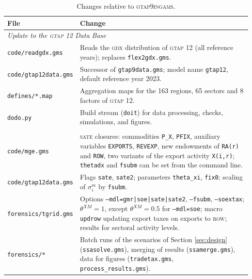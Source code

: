 \documentclass{jgea}
\newcommand{\GDX}{\textsc{gdx}\xspace}
\newcommand{\SATE}{\textsc{sate}\xspace}
\newcommand{\GTAP}{\textsc{gtap}\xspace}
\newcommand{\GTAPnine}{\textsc{gtap9ingams}\xspace}
\begin{document}
\begin{table}[t!]
\begin{center}
\caption{Changes relative to \GTAPnine \citep{LanzRutherford2016}.}\label{tab:changes}
\small
\begin{tabular}{lp{8.2cm}}
\toprule
File & Change \\
\midrule
\multicolumn{2}{l}{\textit{Update to the \GTAP 12 Data Base}} \\
\texttt{code/readgdx.gms} & Reads the \GDX distribution of \GTAP 12
(all reference years); replaces \texttt{flex2gdx.gms}. \\
\texttt{code/gtap12data.gms} & Successor of \texttt{gtap9data.gms};
model name \texttt{gtap12}, default reference year 2023. \\
\texttt{defines/*.map} & Aggregation maps for the 163 regions, 65
sectors and 8 factors of \GTAP 12. \\
\texttt{dodo.py} & Build stream (\texttt{doit}) for data processing,
checks, simulations, and figures. \\
\addlinespace
\multicolumn{2}{l}{\textit{Extensions for this paper}} \\
\texttt{code/mge.gms} & \SATE closures: commodities \texttt{P\_X},
\texttt{PFIX}, auxiliary variables \texttt{EXPORTS}, \texttt{REVEXP},
new endowments of \texttt{RA(r)} and \texttt{ROW}, two variants of the
export activity \texttt{X(i,r)}; \texttt{thetadx} and \texttt{fsubm}
can be set from the command line. \\
\texttt{code/gtap12data.gms} & Flags \texttt{sate}, \texttt{sate2};
parameters \texttt{theta\_xi}, \texttt{fix0}; scaling of
$\sigma^m_i$ by \texttt{fsubm}. \\
\texttt{forensics/tgrid.gms} & Options \texttt{--mdl=gmr|soe|sate|sate2},
\texttt{--fsubm}, \texttt{--soextax}; $\theta^{XM}=1$, except
$\theta^{XM}=0.5$ for \texttt{--mdl=soe}; macro
\texttt{updrow} updating export taxes on exports to \textsc{row};
results for sectoral activity levels. \\
\texttt{forensics/*} & Batch runs of the scenarios of Section
\ref{sec:design} (\texttt{ssasolve.gms}), merging of
results (\texttt{ssamerge.gms}), data for figures
(\texttt{tradetax.gms}, \texttt{process\_results.gms}). \\
\bottomrule
\end{tabular}
\end{center}
\end{table}

\end{document}
